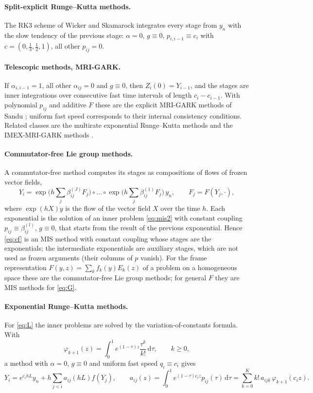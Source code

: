 \documentclass[11pt,a4paper]{article}
\theoremstyle{definition}
\theoremstyle{remark}
\newcommand{\dd}{\,\mathrm{d}}
\begin{document}
\paragraph{Split-explicit Runge--Kutta methods.}
The RK3 scheme of Wicker and Skamarock \cite{WickerSkamarock2002} integrates every stage from $y_n$ with the slow
tendency of the previous stage: $\alpha=0$, $g\equiv0$, $p_{i,i-1}\equiv c_i$ with $c=(0,\tfrac13,\tfrac12,1)$, all
other $p_{ij}=0$.

\paragraph{Telescopic methods, MRI-GARK.}
If $\alpha_{i,i-1}=1$, all other $\alpha_{ij}=0$ and $g\equiv0$, then $Z_i(0)=Y_{i-1}$, and the stages are inner
integrations over consecutive fast time intervals of length $c_i-c_{i-1}$. With polynomial $p_{ij}$ and additive $F$
these are the explicit MRI-GARK methods of Sandu \cite{Sandu2019}; uniform fast speed corresponds to their internal
consistency conditions. Related classes are the multirate exponential Runge--Kutta methods
\cite{LuanChinomonaReynolds2020} and the IMEX-MRI-GARK methods \cite{ChinomonaReynolds2021}.

\paragraph{Commutator-free Lie group methods.}
A commutator-free method \cite{CelledoniMarthinsenOwren2003,Owren2006} computes its stages as compositions of flows of
frozen vector fields,
\begin{equation}\label{eq:cf}
 Y_i=\exp\Big(h\sum_j\beta^{(J)}_{ij}F_j\Big)\circ\dots\circ\exp\Big(h\sum_j\beta^{(1)}_{ij}F_j\Big)\,y_n,\qquad
 F_j=F(Y_j,\cdot),
\end{equation}
where $\exp(hX)y$ is the flow of the vector field $X$ over the time $h$. Each exponential is the solution of an inner
problem \eqref{eq:mis2} with constant coupling $p_{ij}\equiv\beta^{(l)}_{ij}$, $g\equiv0$, that starts from the result of the
previous exponential. Hence \eqref{eq:cf} is an MIS method with constant coupling whose stages are the exponentials; the
intermediate exponentials are auxiliary stages, which are not used as frozen arguments (their columns of $p$ vanish).
For the frame representation $F(y,z)=\sum_kf_k(y)E_k(z)$ of a problem on a homogeneous space these are the
commutator-free Lie group methods; for general $F$ they are MIS methods for \eqref{eq:G}.

\paragraph{Exponential Runge--Kutta methods.}
For \eqref{eq:L} the inner problems are solved by the variation-of-constants formula. With
\[
 \varphi_{k+1}(z)=\int_0^1e^{(1-\tau)z}\frac{\tau^k}{k!}\dd\tau,\qquad k\ge0,
\]
a method with $\alpha=0$, $g\equiv0$ and uniform fast speed $q_i\equiv c_i$ gives
\begin{equation}\label{eq:exprk}
 Y_i=e^{c_ihL}y_n+h\sum_{j<i}a_{ij}(hL)f(Y_j),\qquad
 a_{ij}(z)=\int_0^1e^{(1-\tau)c_iz}p_{ij}(\tau)\dd\tau=\sum_{k=0}^{K}k!\,a_{ijk}\,\varphi_{k+1}(c_iz).
\end{equation}
\end{document}
